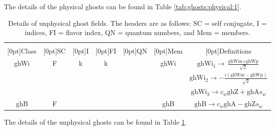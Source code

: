 The details of the physical ghosts can be found in Table \ref{tab:ghosts:physical:1}.  \begin{table}[!h]
\begin{center}
\begin{tabular}{|c|c|c|c|c|c|c|}
\hline
 &  &  &  &  &  & \\
\raisebox{1.5ex}[0pt]{Class} & \raisebox{1.5ex}[0pt]{SC} & \raisebox{1.5ex}[0pt]{I} & \raisebox{1.5ex}[0pt]{FI} & \raisebox{1.5ex}[0pt]{QN} & \raisebox{1.5ex}[0pt]{Mem} & \raisebox{1.5ex}[0pt]{Definitions}\\
\hline\hline
ghWi & F & {k} & {k} & & ghWi & $\text{ghWi}{}_1\to \frac{\text{ghWm}+\text{ghWp}}{\sqrt{2}}$\\
 &  & &  & &  & $\text{ghWi}{}_2\to -\frac{i (\text{ghWm}-\text{ghWp})}{\sqrt{2}}$\\
 &  & &  & &  & $\text{ghWi}{}_3\to c{}_w \text{ghZ}+\text{ghA} s{}_w$\\
ghB & F & {} & {} & & ghB & $\text{ghB}\to c{}_w \text{ghA}-\text{ghZ} s{}_w$\\
\hline
\end{tabular}
\caption[Unphysical Ghost Fields]{\label{tab:ghosts:unphysical:1}Details of unphysical ghost fields.  The headers are as follows:  SC = self conjugate, I = indices, FI = flavor index, QN = quantum numbers, and Mem = members.}
\end{center}
\end{table}
The details of the unphysical ghosts can be found in Table \ref{tab:ghosts:unphysical:1}.  \clearpage
